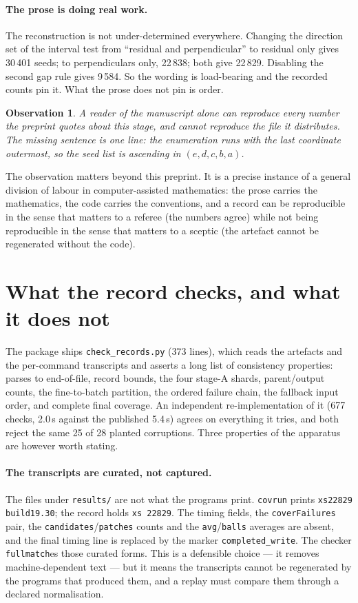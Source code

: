 \documentclass[11pt,a4paper]{article}
\newcommand{\code}[1]{\texttt{\small #1}}
\newtheorem{observation}{Observation}
\begin{document}
\paragraph{The prose is doing real work.} The reconstruction is not under-determined everywhere.
Changing the direction set of the interval test from ``residual and perpendicular'' to residual only
gives 30\,401 seeds; to perpendiculars only, 22\,838; both give 22\,829. Disabling the second gap rule
gives 9\,584. So the wording is load-bearing and the recorded counts pin it. What the prose does not
pin is order.

\begin{observation}
A reader of the manuscript alone can reproduce every number the preprint quotes about this stage, and
cannot reproduce the file it distributes. The missing sentence is one line: the enumeration runs with
the last coordinate outermost, so the seed list is ascending in $(e,d,c,b,a)$.
\end{observation}

The observation matters beyond this preprint. It is a precise instance of a general division of
labour in computer-assisted mathematics: the prose carries the mathematics, the code carries the
conventions, and a record can be reproducible in the sense that matters to a referee (the numbers
agree) while not being reproducible in the sense that matters to a sceptic (the artefact cannot be
regenerated without the code).

\section{What the record checks, and what it does not}\label{sec:apparatus}

The package ships \code{check\_records.py} (373 lines), which reads the artefacts and the per-command
transcripts and asserts a long list of consistency properties: parses to end-of-file, record bounds,
the four stage-A shards, parent/output counts, the fine-to-batch partition, the ordered failure chain,
the fallback input order, and complete final coverage. An independent re-implementation of it (677
checks, 2.0\,s against the published 5.4\,s) agrees on everything it tries, and both reject the same
25 of 28 planted corruptions. Three properties of the apparatus are however worth stating.

\paragraph{The transcripts are curated, not captured.} The files under \code{results/} are not what the
programs print. \code{covrun} prints \code{xs22829 build19.30}; the record holds \code{xs 22829}. The
timing fields, the \code{coverFailures} pair, the \code{candidates}/\code{patches} counts and the
\code{avg}/\code{balls} averages are absent, and the final timing line is replaced by the marker
\code{completed\_write}. The checker \code{fullmatch}es those curated forms. This is a defensible
choice --- it removes machine-dependent text --- but it means the transcripts cannot be regenerated by
the programs that produced them, and a replay must compare them through a declared normalisation.
\end{document}
